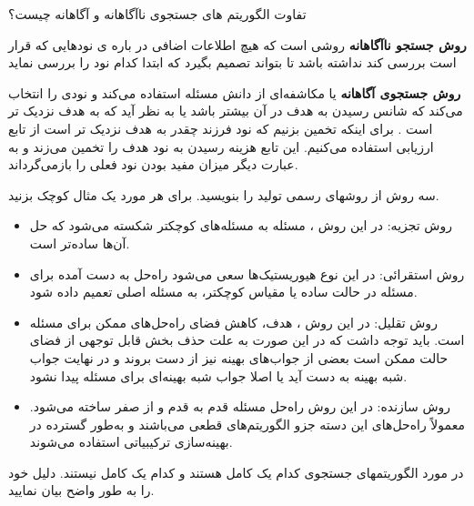 \documentclass[12pt]{article}
\begin{document}
\vspace{20pt}
\noindent
تفاوت الگوریتم های جستجوی ناآگاهانه و آگاهانه چیست؟


\begin{tcolorbox}
\textbf{ روش جستجو ناآگاهانه }
 روشی است که هیچ اطلاعات اضافی در باره ی نودهایی که قرار است بررسی کند نداشته باشد تا بتواند تصمیم بگیرد که ابتدا کدام نود را بررسی نماید
 
 \textbf{ روش جستجوی آگاهانه }
 یا مکاشفه‌ای از دانش مسئله استفاده می‌کند و نودی را انتخاب می‌کند که شانس رسیدن به هدف در آن بیشتر باشد یا به نظر آید که به هدف نزدیک تر است . برای اینکه تخمین بزنیم که نود فرزند چقدر به هدف نزدیک تر است از تابع ارزیابی استفاده می‌کنیم. این تابع هزینه رسیدن به نود هدف را تخمین می‌زند و به عبارت دیگر میزان مفید بودن نود فعلی را بازمی‌گرداند. 
\end{tcolorbox}






\newpage
\vspace{20pt}
\noindent
سه روش از روشهای رسمی تولید 
 را بنویسید. برای هر مورد یک مثال کوچک بزنید.




\begin{tcolorbox}
\begin{itemize}
	\item روش تجزیه: در این روش ، مسئله به مسئله‌های کوچکتر شکسته می‌شود که حل آن‌ها ساده‌تر است.
	\item روش استقرائی: در این نوع هیوریستیک‌ها سعی می‌شود راه‌حل به دست آمده برای مسئله در حالت ساده یا مقیاس کوچکتر، به مسئله اصلی تعمیم داده شود.
	\item روش تقلیل: در این روش‌  ، هدف، کاهش فضای راه‌حل‌های ممکن برای مسئله است. باید توجه داشت که در این صورت به علت حذف بخش قابل توجهی از فضای حالت ممکن است بعضی از جواب‌های بهینه نیز از دست بروند و در نهایت جواب شبه بهینه به دست آید یا اصلا جواب شبه بهینه‌ای برای مسئله پیدا نشود.
	\item روش سازنده: در این روش راه‌حل مسئله قدم به قدم و از صفر ساخته می‌شود. معمولاً راه‌حل‌های این دسته جزو الگوریتم‌های قطعی می‌باشند و به‌طور گسترده در بهینه‌سازی ترکیبیاتی استفاده می‌شوند.
\end{itemize}
\end{tcolorbox}





\newpage
\vspace{20pt}
\noindent
در مورد الگوریتمهای جستجوی 
کدام یک کامل هستند و کدام یک کامل نیستند. دلیل خود را به طور واضح بیان نمایید.
\end{document}
